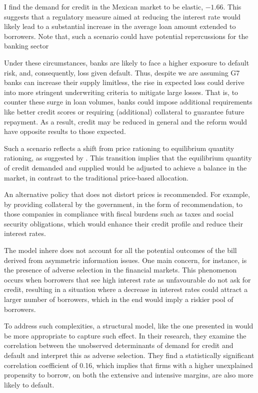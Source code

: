 \documentclass[11pt, oneside]{book}
\begin{document}
I find the demand for credit in the Mexican market to be elastic, $-1.66$. This suggests that a regulatory measure aimed at reducing the interest rate would likely lead to a substantial increase in the average loan amount extended to borrowers. Note that,  such a scenario could have potential repercussions for the banking sector

Under these circumstances, banks are likely to face a higher exposure to default risk, and, consequently, loss given default. Thus, despite we are assuming G7 banks can increase their supply limitless, the rise in expected loss could derive into more stringent underwriting criteria to mitigate large losses. That is, to counter these surge in loan volumes, banks could impose additional requirements like better credit scores or requiring (additional) collateral to guarantee future repayment. As a result, credit may be reduced in general and the reform would have opposite results to those expected. 

Such a scenario reflects a shift from price rationing to equilibrium quantity rationing, as suggested by \citep[p. 4]{blundell1992credit}. This transition implies that the equilibrium quantity of credit demanded and supplied would be adjusted to achieve a balance in the market, in contrast to the traditional price-based allocation. 

An alternative policy that does not distort prices is recommended. For example, by providing collateral by the government, in the form of recommendation, to those companies in compliance with fiscal burdens such as taxes and social security obligations, which would enhance their credit profile and reduce their interest rates. 

The model inhere does not account for all the potential outcomes of the bill derived from asymmetric information issues. One main concern, for instance, is the presence of adverse selection in the financial markets. This phenomenon occurs when borrowers that see high interest rate as unfavourable do not ask for credit, resulting in a situation where a decrease in interest rates could attract a larger number of borrowers, which in the end would imply a riskier pool of borrowers.

To address such complexities, a structural model, like the one presented in \cite{crawford2018asymmetric} would be more appropriate to capture such effect. In their research, they examine the correlation between the unobserved determinants of demand for credit and default and interpret this as adverse selection. They find a statistically significant correlation coefficient of 0.16, which implies that firms with a higher unexplained propensity to borrow, on both the extensive and intensive margins, are also more likely to default. 
\end{document}
